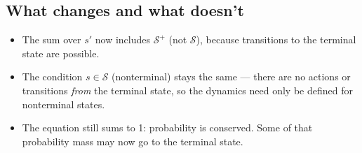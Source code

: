 \documentclass[11pt]{article}
\begin{document}
\subsection*{What changes and what doesn't}

\begin{itemize}
    \item The sum over $s'$ now includes $\mathcal{S}^+$ (not $\mathcal{S}$),
          because transitions to the terminal state are possible.
    \item The condition $s \in \mathcal{S}$ (nonterminal) stays the same ---
          there are no actions or transitions \emph{from} the terminal state,
          so the dynamics need only be defined for nonterminal states.
    \item The equation still sums to 1: probability is conserved. Some of
          that probability mass may now go to the terminal state.
\end{itemize}
\end{document}
